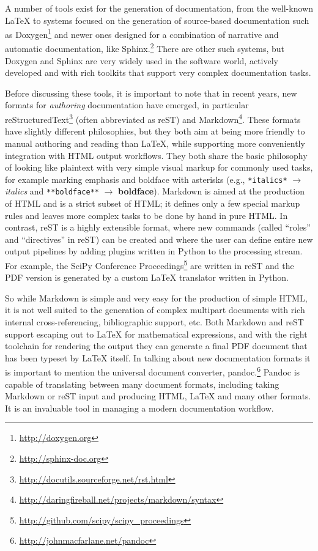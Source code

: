 \documentclass[ChapterTOCs,krantz2]{krantz} %
\begin{document}
A number of tools exist for the generation of documentation, from the
well-known \LaTeX{} to systems focused on the generation of source-based
documentation such as Doxygen\footnote{\url{http://doxygen.org}} and newer ones
designed for a combination of narrative and automatic
documentation, like Sphinx.\footnote{\url{http://sphinx-doc.org}}  There are
other such systems, but Doxygen and Sphinx are very widely used in the software
world, actively developed and with rich toolkits that support very complex
documentation tasks.

Before discussing these tools, it is important to note that in recent years,
new formats for \emph{authoring} documentation have emerged, in particular
reStructuredText\footnote{\url{http://docutils.sourceforge.net/rst.html}}
(often abbreviated as reST) and
Markdown\footnote{\url{http://daringfireball.net/projects/markdown/syntax}}.
These formats have slightly different philosophies, but they both aim at being
more friendly to manual authoring and reading than \LaTeX{}, while supporting
more conveniently integration with HTML output workflows.  They both share the
basic philosophy of looking like plaintext with very simple visual markup for
commonly used tasks, for example marking emphasis and boldface with
asterisks (e.g., \texttt{*italics*} $\rightarrow$ \emph{italics} and
\texttt{**boldface**} $\rightarrow$ \textbf{boldface}).  Markdown is
 aimed at the production of HTML and is a strict subset of HTML; it
defines only a few special markup rules and leaves more complex tasks to be
done by hand in pure HTML.  In contrast, reST is a highly extensible format,
where new commands (called ``roles'' and ``directives'' in reST) can be created
and where the user can define entire new output pipelines by adding plugins
written in Python to the processing stream. For example, the SciPy Conference
Proceedings\footnote{\url{http://github.com/scipy/scipy_proceedings}} are written in reST and the PDF version is generated by a custom
\LaTeX{} translator written in Python.

So while Markdown is simple and very easy for the production of simple HTML, it
is not well suited to the generation of complex multipart documents with rich
internal cross-referencing, bibliographic support, etc.  Both Markdown and reST
support escaping out to \LaTeX{} for mathematical expressions, and with the
right toolchain for rendering the output they can generate a final PDF document
that has been typeset by \LaTeX{} itself.  In talking about new documentation
formats it is important to mention the universal document converter,
pandoc.\footnote{\url{http://johnmacfarlane.net/pandoc}} Pandoc is capable of
translating between many document formats, including taking Markdown or reST
input and producing HTML, \LaTeX{} and many other formats.  It is an invaluable
tool in managing a modern documentation workflow.
\end{document}
